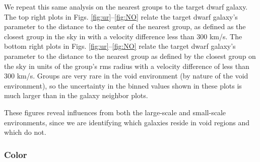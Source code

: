 We repeat this same analysis on the nearest groups to the target dwarf galaxy.  
The top right plots in Figs. \ref{fig:ur}--\ref{fig:NO} relate the target dwarf 
galaxy's parameter to the distance to the center of the nearest group, as 
defined as the closest group in the sky in \hMpc with a velocity difference less 
than 300 km/s.  The bottom right plots in Figs. \ref{fig:ur}--\ref{fig:NO} 
relate the target dwarf galaxy's parameter to the distance to the nearest group 
as defined by the closest group on the sky in units of the group's rms radius 
with a velocity difference of less than 300 km/s.  Groups are very rare in the 
void environment (by nature of the void environment), so the uncertainty in the 
binned values shown in these plots is much larger than in the galaxy neighbor 
plots.

These figures reveal influences from both the large-scale and small-scale 
environments, since we are identifying which galaxies reside in void regions and 
which do not.


\subsubsection{Color}

